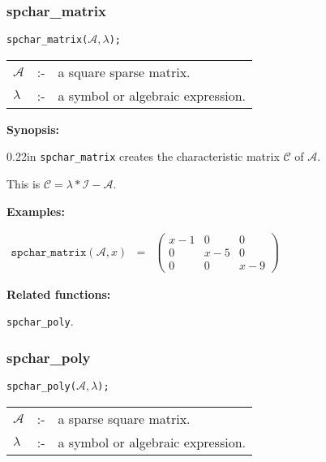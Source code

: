 \subsubsection{spchar\_matrix}

\hspace*{0.175in} \texttt{spchar\_matrix($\mathcal{A},\lambda$);}

\hspace*{0.1in} 
\begin{tabular}{l l l}
$\mathcal{A}$ &:-& a square sparse matrix. \\
$\lambda$  &:-& a symbol or algebraic expression. 
\end{tabular}

\textbf{Synopsis:} 

\begin{addtolength}{\leftskip}{0.22in}
\texttt{spchar\_matrix} creates the characteristic matrix $\mathcal{C}$ of 
$\mathcal{A}$.

This is $\mathcal{C} = \lambda * \mathcal{I} - \mathcal{A}$. 

\end{addtolength}

\textbf{Examples:}

\begin{flushleft}  
\hspace*{0.1in}
\begin{math}  
\begin{array}{ccc}
\texttt{spchar\_matrix}(\mathcal{A},x) & = & 
\left( \begin{array}{ccc} x-1 & 0 & 0 \\ 0 & x-5 & 0 \\ 0 & 0 & x-9 
\end{array} \right)  
\end{array}  
\end{math}  
\end{flushleft}

\textbf{Related functions:}

\hspace*{0.175in} \texttt{spchar\_poly}. 


\subsubsection{spchar\_poly}

\hspace*{0.175in} \texttt{spchar\_poly($\mathcal{A},\lambda$);}

\hspace*{0.1in} 
\begin{tabular}{l l l}
$\mathcal{A}$ &:-& a sparse square matrix. \\
$\lambda$ &:-& a symbol or algebraic expression.
\end{tabular}

